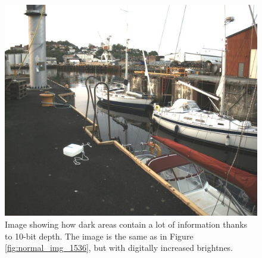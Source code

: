 \begin{figure}[H]
    \centering
    \includegraphics[width=.8\textwidth]{figures/pictures/gained_right_96.jpeg}
    \caption{Image showing how dark areas contain a lot of information thanks to 10-bit depth. The image is the same as in Figure \ref{fig:normal_img_1536}, but with digitally increased brightnes.}
    \label{fig:gained_image}
\end{figure}


